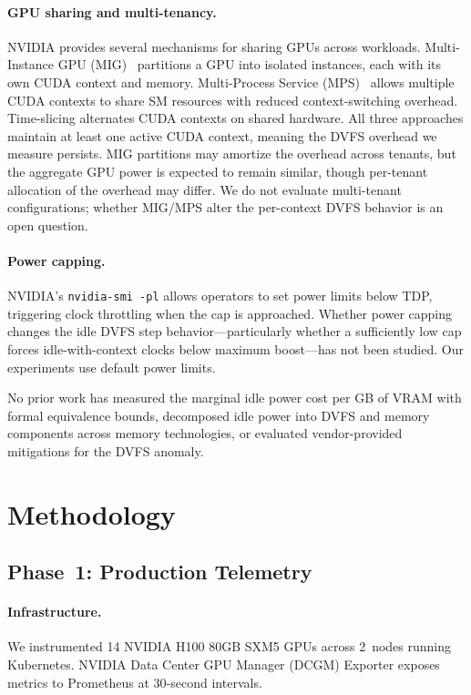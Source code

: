 \documentclass[sigconf,nonacm]{acmart}
\begin{document}
\paragraph{GPU sharing and multi-tenancy.} NVIDIA provides several mechanisms for sharing GPUs across workloads. Multi-Instance GPU (MIG)~\cite{nvidia-mig} partitions a GPU into isolated instances, each with its own CUDA context and memory. Multi-Process Service (MPS)~\cite{nvidia-mps} allows multiple CUDA contexts to share SM resources with reduced context-switching overhead. Time-slicing alternates CUDA contexts on shared hardware. All three approaches maintain at least one active CUDA context, meaning the DVFS overhead we measure persists. MIG partitions may amortize the overhead across tenants, but the aggregate GPU power is expected to remain similar, though per-tenant allocation of the overhead may differ. We do not evaluate multi-tenant configurations; whether MIG/MPS alter the per-context DVFS behavior is an open question.

\paragraph{Power capping.} NVIDIA's \texttt{nvidia-smi -pl} allows operators to set power limits below TDP, triggering clock throttling when the cap is approached. Whether power capping changes the idle DVFS step behavior---particularly whether a sufficiently low cap forces idle-with-context clocks below maximum boost---has not been studied. Our experiments use default power limits.

No prior work has measured the marginal idle power cost per GB of VRAM with formal equivalence bounds, decomposed idle power into DVFS and memory components across memory technologies, or evaluated vendor-provided mitigations for the DVFS anomaly.

\section{Methodology}

\subsection{Phase~1: Production Telemetry}

\paragraph{Infrastructure.} We instrumented 14 NVIDIA H100 80GB SXM5 GPUs across 2~nodes running Kubernetes. NVIDIA Data Center GPU Manager (DCGM) Exporter exposes metrics to Prometheus at 30-second intervals.
\end{document}
